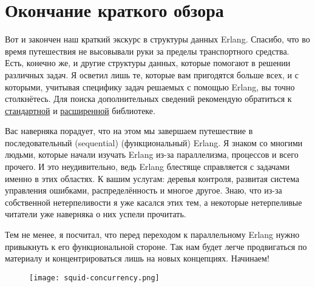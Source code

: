 \section{Окончание краткого обзора}
Вот и закончен наш краткий экскурс в структуры данных Erlang.
Спасибо, что во время путешествия не высовывали руки за пределы транспортного средства.
Есть, конечно же, и другие структуры данных, которые помогают в решении различных задач.
Я осветил лишь те, которые вам пригодятся больше всех, и с которыми, учитывая специфику задач решаемых с помощью  Erlang, вы точно столкнётесь.
Для поиска дополнительных сведений рекомендую обратиться к \href{http://www.erlang.org/doc/apps/stdlib/index.html}{стандартной} и \href{http://www.erlang.org/doc/applications.html}{расширенной} библиотеке.

Вас наверняка порадует, что на этом мы завершаем путешествие в последовательный (sequential) (функциональный) Erlang.
Я знаком со многими людьми, которые начали изучать  Erlang из\--за параллелизма, процессов и всего прочего.
И это неудивительно, ведь Erlang блестяще справляется с задачами именно в этих областях.
К вашим услугам: деревья контроля, развитая система управления ошибками, распределённость и многое другое.
Знаю, что из\--за собственной нетерпеливости я уже касался этих тем, а некоторые нетерпеливые читатели уже наверняка о них успели прочитать.

Тем не менее, я посчитал, что перед переходом к параллельному Erlang нужно привыкнуть к его функциональной стороне.
Так нам будет легче продвигаться по материалу и концентрироваться лишь на новых концепциях.
Начинаем!
\begin{figure}[h!]
    \centering
    \texttt{[image: squid-concurrency.png]}
\end{figure}
